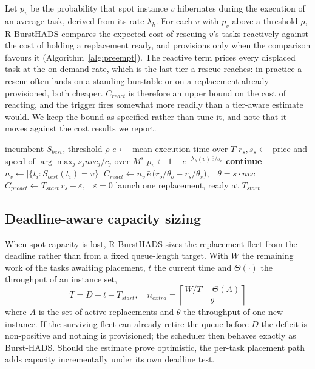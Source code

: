 \documentclass[conference]{IEEEtran}
\begin{document}
Let $p_v$ be the probability that spot instance $v$ hibernates during the
execution of an average task, derived from its rate $\lambda_h$. For each $v$
with $p_v$ above a threshold $\rho$, R-BurstHADS compares the expected cost of
rescuing $v$'s tasks reactively against the cost of holding a replacement
ready, and provisions only when the comparison favours it
(Algorithm~\ref{alg:preempt}). The reactive term prices every displaced task
at the on-demand rate, which is the last tier a rescue reaches: in practice a
rescue often lands on a standing burstable or on a replacement already
provisioned, both cheaper. $C_{\mathit{react}}$ is therefore an upper bound on
the cost of reacting, and the trigger fires somewhat more readily than a
tier-aware estimate would. We keep the bound as specified rather than tune it,
and note that it moves against the cost results we report.

\begin{algorithm}[t]
\caption{\textsc{PreemptiveProvision} (Theorem 1). \textbf{This work.}}
\label{alg:preempt}
\begin{algorithmic}[1]
\REQUIRE incumbent $S_{\mathit{best}}$, threshold $\rho$
\STATE $\bar{e} \leftarrow$ mean execution time over $T$
\STATE $r_s, s_s \leftarrow$ price and speed of $\arg\max_j s_j\mathit{nvc}_j/c_j$ over $M^{s}$
  \STATE $p_v \leftarrow 1 - e^{-\lambda_h(v)\,\bar{e}/s_v}$
   \STATE \textbf{continue} \ENDIF
  \STATE $n_v \leftarrow |\{t_i : S_{\mathit{best}}(t_i) = v\}|$
  \STATE $C_{\mathit{react}} \leftarrow n_v\,\bar{e}\,\big(r_{o}/\theta_{o} - r_s/\theta_s\big)$,\ \ $\theta = s\cdot\mathit{nvc}$
  \STATE $C_{\mathit{proact}} \leftarrow T_{\mathit{start}}\,r_s + \varepsilon$,\ \ $\varepsilon = 0$
    \STATE launch one replacement, ready at $T_{\mathit{start}}$
  \ENDIF
\ENDFOR
\end{algorithmic}
\end{algorithm}

\subsection{Deadline-aware capacity sizing}

When spot capacity is lost, R-BurstHADS sizes the replacement fleet from the
deadline rather than from a fixed queue-length target. With $W$ the remaining
work of the tasks awaiting placement, $t$ the current time and $\Theta(\cdot)$
the throughput of an instance set,
\begin{equation}
T = D - t - T_{\mathit{start}}, \quad
n_{\mathit{extra}} = \left\lceil \frac{W/T - \Theta(A)}{\theta} \right\rceil
\label{eq:sizing}
\end{equation}
where $A$ is the set of active replacements and $\theta$ the throughput of one
new instance. If the surviving fleet can already retire the queue before $D$
the deficit is non-positive and nothing is provisioned; the scheduler then
behaves exactly as Burst-HADS. Should the estimate prove optimistic, the
per-task placement path adds capacity incrementally under its own deadline
test.
\end{document}
